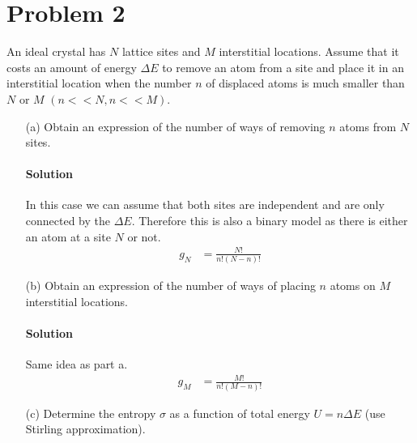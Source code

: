 \documentclass{article}
\begin{document}
		
		
	\section*{Problem 2}
	An ideal crystal has $N$ lattice sites and $M$ interstitial locations. Assume that it costs an amount of energy $\Delta E$ to remove an atom from a site and place it in an interstitial location when the number $n$ of displaced atoms is much smaller than $N$ or $M$ $\left(n << N, n << M \right)$.
	\begin{enumerate}
		\item[(a)] Obtain an expression of the number of ways of removing $n$ atoms from $N$ sites.
		\paragraph{Solution} In this case we can assume that both sites are independent and are only connected by the $\Delta E$. Therefore this is also a binary model as there is either an atom at a site $N$ or not.
		\begin{align*}
			g_N &= \boxed{\frac{N!}{n! \left( N - n \right)!}}
		\end{align*}
		
		\item[(b)] Obtain an expression of the number of ways of placing $n$ atoms on $M$ interstitial locations.
		\paragraph{Solution} Same idea as part a.
		\begin{align*}
			g_M &= \boxed{\frac{M!}{n! \left( M - n \right)!}}
		\end{align*}
		
		\item[(c)] Determine the entropy $\sigma$ as a function of total energy $U = n \Delta E$ (use Stirling approximation). 

\end{enumerate}
\end{document}
